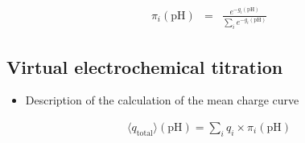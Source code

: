 \documentclass[9pt,lineno,final]{elife}
\newcommand{\pH}{\mathrm{pH}}
\begin{document}
\begin{eqnarray}
	\pi_i(\pH) &=& \frac{e^{-g_i(\pH)}}{\sum_i e^{-g_i(\pH)} }
\end{eqnarray}

\subsection{Virtual electrochemical titration}


\begin{itemize}
	\item Description of the calculation of the mean charge curve \\
\end{itemize}

\begin{eqnarray}
	\langle q_\text{total} \rangle (\pH) = \sum_i q_i \times \pi_i(\pH) 
\end{eqnarray}
\end{document}
